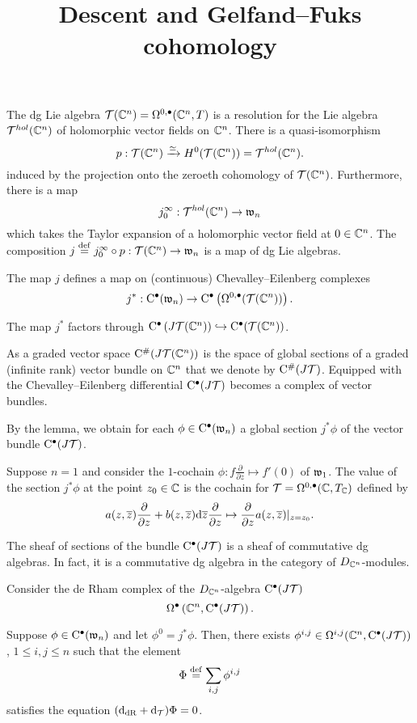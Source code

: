 \documentclass[11pt]{amsart}
\numberwithin{equation}{section}
\def\define{\overset{\rm def}{=}}
\begin{document}
\title{Descent and Gelfand--Fuks cohomology}

The dg Lie algebra $\mathcal T(\mathbb C^n) = \Omega^{0,\bullet}(\mathbb C^n, T)$ is a resolution for the Lie algebra $\mathcal T^{hol}(\mathbb C^n)$ of holomorphic vector fields on $\mathbb C^n$. 
There is a quasi-isomorphism
\[
p : \mathcal T(\mathbb C^n) \xrightarrow{\simeq}  H^0(\mathcal T(\mathbb C^n)) = \mathcal T^{hol}(\mathbb C^n) .
\]
induced by the projection onto the zeroeth cohomology of $\mathcal T(\mathbb C^n)$. 
Furthermore, there is a map 
\[
j_0^\infty :  \mathcal T^{hol}(\mathbb C^n) \to \mathfrak w_n
\]
which takes the Taylor expansion of a holomorphic vector field at $0 \in \mathbb C^n$. 
The composition $j \define j_0^\infty \circ p : \cT(\CC^n) \to \fw_n$ is a map of dg Lie algebras. 

The map $j$ defines a map on (continuous) Chevalley--Eilenberg complexes
\[
j^* : {\rm C}^\bullet(\mathfrak w_n) \to {\rm C}^\bullet\left(\Omega^{0,\bullet}(\mathcal T(\mathbb C^n))\right) .
\]

\begin{lem}
The map $j^*$ factors through ${\rm C}^\bullet\left(J \mathcal T(\mathbb C^n) \right) \hookrightarrow {\rm C}^\bullet(\mathcal T(\mathbb C^n))$.
\end{lem}

As a graded vector space ${\rm C}^{\#}(J \mathcal T(\mathbb C^n))$ is the space of global sections of a graded (infinite rank) vector bundle on $\mathbb C^n$ that we denote by ${\rm C}^{\#}(J \mathcal T)$. 
Equipped with the Chevalley--Eilenberg differential ${\rm C}^\bullet(J \mathcal T)$ becomes a complex of vector bundles. 

By the lemma, we obtain for each $\phi \in {\rm C}^\bullet(\mathfrak w_n)$ a global section $j^* \phi$ of the vector bundle ${\rm C}^\bullet(J \mathcal T)$. 

\begin{eg}
Suppose $n=1$ and consider the $1$-cochain $\phi : f \frac{\partial}{\partial z} \mapsto f'(0)$ of $\mathfrak w_1$. 
The value of the section $j^* \phi$ at the point $z_0 \in \mathbb C$ is the cochain for $\mathcal T = \Omega^{0,\bullet}(\mathbb C, T_\mathbb C)$ defined by
\[
a(z,\overline{z}) \frac{\partial}{\partial z} + b(z,\overline{z}) {\rm d} \overline{z} \frac{\partial}{\partial z} \mapsto \frac{\partial}{\partial z} a(z,\overline{z}) |_{z = z_0} .
\]
\end{eg}

The sheaf of sections of the bundle ${\rm C}^\bullet(J \mathcal T)$ is a sheaf of commutative dg algebras. 
In fact, it is a commutative dg algebra in the category of $D_{\mathbb C^n}$-modules.

Consider the de Rham complex of the $D_{\mathbb C^n}$-algebra ${\rm C}^\bullet(J \mathcal T)$
\[
\Omega^\bullet \left(\mathbb C^n , {\rm C}^\bullet(J \mathcal T) \right) .
\]

\begin{thm}
Suppose $\phi \in {\rm C}^\bullet(\mathfrak w_n)$ and let $\phi^0 = j^* \phi$. 
Then, there exists $\phi^{i,j} \in \Omega^{i,j} (\mathbb C^n , {\rm C}^\bullet(J \mathcal T))$, $1 \leq i,j \leq n$ such that the element 
\[
\Phi \define \sum_{i,j} \phi^{i,j} 
\]
satisfies the equation $({\rm d}_{\rm dR} + {\rm d}_{\mathcal T}) \Phi = 0$. 
\end{thm}
\end{document}
